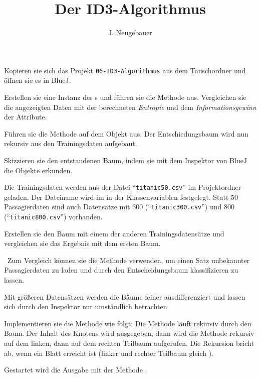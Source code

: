 \documentclass[10pt, a4paper]{scrartcl}
\author{J. Neugebauer}
\title{Der ID3-Algorithmus}
\date{\Heute}
\begin{document}
\ReiheTitel

Kopieren sie sich das Projekt \texttt{06-ID3-Algorithmus} aus dem Tauschordner
und öffnen sie es in BlueJ.

\begin{aufgabe}
	Erstellen sie eine Instanz des s und führen sie die Methode 
	 aus. Vergleichen sie die angezeigten Daten mit
	der berechneten \emph{Entropie} und dem \emph{Informationsgewinn} der Attribute.
\end{aufgabe}

\begin{aufgabe}
	Führen sie die Methode  auf dem Objekt aus. Der
	Entschiedungsbaum wird nun rekursiv aus den Trainingsdaten aufgebaut.
	
	Skizzieren sie den entstandenen Baum, indem sie mit dem Inspektor von BlueJ 
	die Objekte erkunden.
	
	\begin{rahmen}
		\vspace*{4cm}
	\end{rahmen}
	\medskip
\end{aufgabe}

\begin{aufgabe}
	Die Trainingsdaten werden aus der Datei \enquote{\texttt{titanic50.csv}} im
	Projektordner geladen. Der Dateiname wird im  in der Klassenvariablen
	 festgelegt. Statt 50 Passagierdaten sind auch Datensätze mit
	300 (\enquote{\texttt{titanic300.csv}}) und 800 (\enquote{\texttt{titanic800.csv}})
	vorhanden.
	
	Erstellen sie den Baum mit einem der anderen Trainingsdatensätze und vergleichen sie
	das Ergebnis mit dem ersten Baum.
	
	\symInfo\ Zum Vergleich können sie die Methode  verwenden, um einen Satz
	unbekannter Passagierdaten zu laden und durch den Entscheidungsbaum klassifizieren zu lassen.
\end{aufgabe}

\begin{aufgabe}
	Mit größeren Datensätzen werden die Bäume feiner ausdifferenziert und lassen sich durch
	den Inspektor nur umständlich betrachten.
	
	Implementieren sie die Methode  wie folgt:
	Die Methode läuft rekursiv durch den Baum. Der Inhalt des Knotens wird ausgegeben, dann wird die Methode
	rekursiv auf dem linken, dann auf dem rechten Teilbaum aufgerufen. Die Rekursion bricht ab, wenn ein Blatt
	erreicht ist (linker und rechter Teilbaum gleich ).
	
	Gestartet wird die Ausgabe mit der Methode .
\end{aufgabe}
\end{document}
